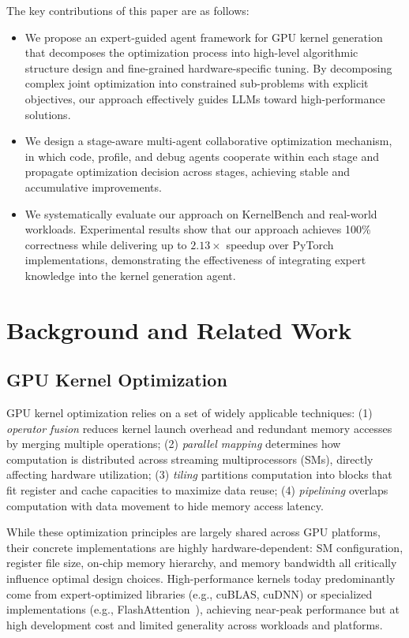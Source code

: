 \documentclass{article}
\theoremstyle{plain}
\theoremstyle{definition}
\theoremstyle{remark}
\begin{document}
The key contributions of this paper are as follows:
\begin{itemize}
\item We propose an expert-guided agent framework for GPU kernel generation that decomposes the optimization process into high-level algorithmic structure design and fine-grained hardware-specific tuning. By decomposing complex joint optimization into constrained sub-problems with explicit objectives, our approach effectively guides LLMs toward high-performance solutions.

\item We design a stage-aware multi-agent collaborative optimization mechanism, in which code, profile, and debug agents cooperate within each stage and propagate optimization decision across stages, achieving stable and accumulative improvements.

\item We systematically evaluate our approach on KernelBench and real-world workloads. Experimental results show that our approach achieves 100\% correctness while delivering up to $2.13\times$ speedup over PyTorch implementations, demonstrating the effectiveness of integrating expert knowledge into the kernel generation agent.
\end{itemize}

\section{Background and Related Work}
\subsection{GPU Kernel Optimization}
GPU kernel optimization relies on a set of widely applicable techniques: (1) \textit{operator fusion} reduces kernel launch overhead and redundant memory accesses by merging multiple operations; (2) \textit{parallel mapping} determines how computation is distributed across streaming multiprocessors (SMs), directly affecting hardware utilization; (3) \textit{tiling} partitions computation into blocks that fit register and cache capacities to maximize data reuse; (4) \textit{pipelining} overlaps computation with data movement to hide memory access latency.

While these optimization principles are largely shared across GPU platforms, their concrete implementations are highly hardware-dependent: SM configuration, register file size, on-chip memory hierarchy, and memory bandwidth all critically influence optimal design choices. High-performance kernels today predominantly come from expert-optimized libraries (e.g., cuBLAS, cuDNN) or specialized implementations (e.g., FlashAttention~\cite{flashattention}), achieving near-peak performance but at high development cost and limited generality across workloads and platforms.
\end{document}
